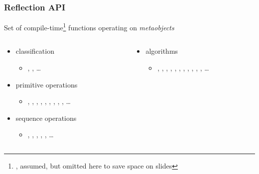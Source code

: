 \documentclass[compress,table,xcolor=table]{beamer}
\begin{document}
\begin{frame}[fragile]
  \frametitle{Reflection API}
  \larger
  Set of compile-time\footnote{, 
    assumed, but omitted here to save space on slides}
   functions operating on {\em metaobjects}
  \smaller
  \begin{columns}
    \begin{column}{.50\textwidth}
      \begin{itemize}
        \item classification
          \begin{itemize}
            \smaller
            \item {}, ,
              \ldots
          \end{itemize}
        \item primitive operations
          \begin{itemize}
            \smaller
            \item {}, ,
              , ,
              , ,
              ,
              , , \ldots
          \end{itemize}
        \item sequence operations
          \begin{itemize}
            \smaller
            \item {}, ,
              , , , \ldots
          \end{itemize}
      \end{itemize}
    \end{column}
    \begin{column}{.50\textwidth}
      \begin{itemize}
        \item algorithms
          \begin{itemize}
            \smaller
            \item {}, ,
              , ,
              , ,
              , ,
              , ,
              , \ldots

\end{itemize}
\end{itemize}
\end{column}
\end{columns}
\end{frame}
\end{document}
